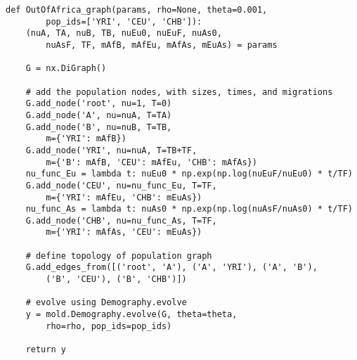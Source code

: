 \documentclass[10pt]{article}
\makeatletter
\newcommand{\py}[1]{\lstinline[breaklines=true,language=Python, showstringspaces=False]@#1@}
\renewcommand{\lstlistingname}{Example Code}
\makeatother
\begin{document}
\begin{lstlisting}[caption={\textbf{Out of Africa Demography graph:} The same model as \lstlistingname~\ref{lst:ooa}, but defined using the Demography module. The Demography method takes advantage of the package \py{networkx}, which we \py{import networkx as nx}. Here, we define populations (nodes) with attributes (such as migration rates and sizes), and then define edges to relate populations.}, float, label={lst:ooa_demo}]
def OutOfAfrica_graph(params, rho=None, theta=0.001, 
        pop_ids=['YRI', 'CEU', 'CHB']):
    (nuA, TA, nuB, TB, nuEu0, nuEuF, nuAs0, 
        nuAsF, TF, mAfB, mAfEu, mAfAs, mEuAs) = params
    
    G = nx.DiGraph()
    
    # add the population nodes, with sizes, times, and migrations
    G.add_node('root', nu=1, T=0)
    G.add_node('A', nu=nuA, T=TA)
    G.add_node('B', nu=nuB, T=TB, 
        m={'YRI': mAfB})
    G.add_node('YRI', nu=nuA, T=TB+TF, 
        m={'B': mAfB, 'CEU': mAfEu, 'CHB': mAfAs})
    nu_func_Eu = lambda t: nuEu0 * np.exp(np.log(nuEuF/nuEu0) * t/TF)
    G.add_node('CEU', nu=nu_func_Eu, T=TF, 
        m={'YRI': mAfEu, 'CHB': mEuAs})
    nu_func_As = lambda t: nuAs0 * np.exp(np.log(nuAsF/nuAs0) * t/TF)
    G.add_node('CHB', nu=nu_func_As, T=TF, 
        m={'YRI': mAfAs, 'CEU': mEuAs})
        
    # define topology of population graph
    G.add_edges_from([('root', 'A'), ('A', 'YRI'), ('A', 'B'),
        ('B', 'CEU'), ('B', 'CHB')])
        
    # evolve using Demography.evolve
    y = mold.Demography.evolve(G, theta=theta, 
        rho=rho, pop_ids=pop_ids)
        
    return y
\end{lstlisting}
\end{document}
